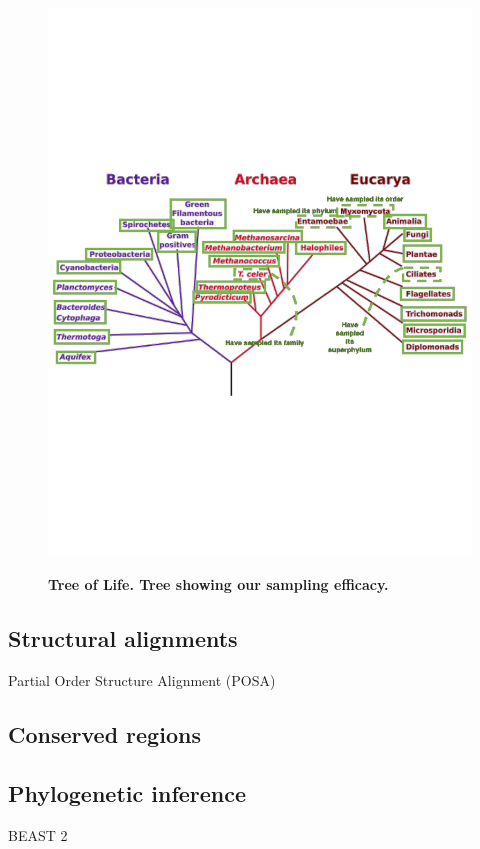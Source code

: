 \documentclass[10pt,letterpaper]{article}
\begin{document}
\begin{figure}
  \caption{\bf Tree of Life.  Tree showing our sampling efficacy.}
  \centering
    \includegraphics[width=\textwidth]{TreeofLife.pdf}
  \label{sampledtree}  
\end{figure}


\subsection*{Structural alignments}


Partial Order Structure Alignment (POSA)


\subsection*{Conserved regions}


\subsection*{Phylogenetic inference}
BEAST 2
\end{document}
